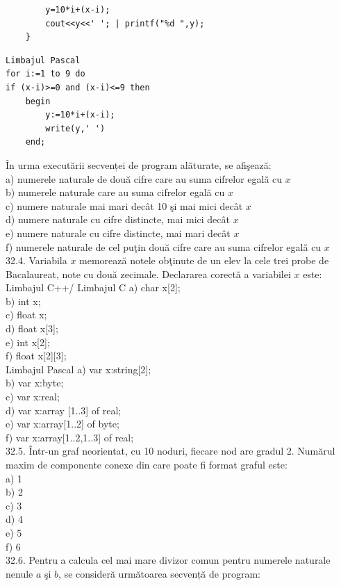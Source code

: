 \begin{itemize}
\begin{enumerate}
\begin{verbatim}
        y=10*i+(x-i);
        cout<<y<<' '; | printf("%d ",y);
    }
\end{verbatim}
\begin{verbatim}
Limbajul Pascal
for i:=1 to 9 do
if (x-i)>=0 and (x-i)<=9 then
    begin
        y:=10*i+(x-i);
        write(y,' ')
    end;
\end{verbatim}
În urma executării secvenței de program alăturate, se afişează:
\\
a) numerele naturale de două cifre care au suma cifrelor egală cu $x$
\\
b) numerele naturale care au suma cifrelor egală cu $x$
\\
c) numere naturale mai mari decât 10 şi mai mici decât $x$
\\
d) numere naturale cu cifre distincte, mai mici decât $x$
\\
e) numere naturale cu cifre distincte, mai mari decât $x$
\\
f) numerele naturale de cel puţin două cifre care au suma cifrelor egală cu $x$
\\
32.4. Variabila $x$ memorează notele obţinute de un elev la cele trei probe de Bacalaureat, note cu două zecimale. Declararea corectă a variabilei $x$ este:
\\
Limbajul C++/ Limbajul C
a) char x[2];
\\
b) int x;
\\
c) float x;
\\
d) float x[3];
\\
e) int x[2];
\\
f) float x[2][3];
\\
Limbajul Pascal
a) var x:string[2];
\\
b) var x:byte;
\\
c) var x:real;
\\
d) var x:array [1..3] of real;
\\
e) var x:array[1..2] of byte;
\\
f) var x:array[1..2,1..3] of real;
\\
32.5. Într-un graf neorientat, cu 10 noduri, fiecare nod are gradul 2. Numărul maxim de componente conexe din care poate fi format graful este:
\\
a) 1
\\
b) 2
\\
c) 3
\\
d) 4
\\
e) 5
\\
f) 6
\\
32.6. Pentru a calcula cel mai mare divizor comun pentru numerele naturale nenule $a$ şi $b$, se consideră următoarea secvență de program:

\end{enumerate}
\end{itemize}
